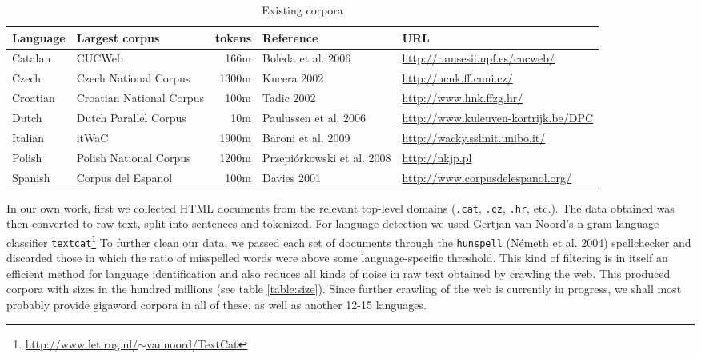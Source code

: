 \documentclass[10pt, a4paper]{article}
\begin{document}
\begin{table*}[ht]
\centering
\begin{tabular}{|l|l|r|l|l|}
\hline
Language & Largest corpus & tokens & Reference & URL\\
\hline
Catalan & CUCWeb & 166m & Boleda et al. 2006\nocite{boleda2006cucweb} & \href{http://ramsesii.upf.es/cucweb/}{http://ramsesii.upf.es/cucweb/}\\
Czech & Czech National Corpus& 1300m & Kucera 2002\nocite{kucera2002czech} & \href{http://ucnk.ff.cuni.cz/}{http://ucnk.ff.cuni.cz/}\\
Croatian & Croatian National Corpus& 100m & Tadic 2002\nocite{tadic2002building}& \href{http://www.hnk.ffzg.hr/}{http://www.hnk.ffzg.hr/} \\
Dutch & Dutch Parallel Corpus & 10m & Paulussen et al. 2006\nocite{paulussen2006dutch} & \href{http://www.kuleuven-kortrijk.be/DPC}{http://www.kuleuven-kortrijk.be/DPC} \\
Italian & itWaC & 1900m & Baroni et al. 2009& \href{http://wacky.sslmit.unibo.it/}{http://wacky.sslmit.unibo.it/} \\
Polish & Polish National Corpus & 1200m &Przepi{\'o}rkowski et al. 2008\nocite{przepiorkowski2008towards}& \href{http://nkjp.pl}{http://nkjp.pl} \\
Spanish & Corpus del Espanol & 100m & Davies 2001\nocite{davies2001creating}& \href{http://www.corpusdelespanol.org/}{http://www.corpusdelespanol.org/}\\
\hline
\end{tabular}
\caption{Existing corpora}
\label{table:existing}
\end{table*}

In our own work, first we collected HTML documents from the relevant top-level domains
(\texttt{.cat}, \texttt{.cz}, \texttt{.hr}, etc.). The data obtained was then
converted to raw text, split into sentences and tokenized. For language
detection we used Gertjan van Noord’s n-gram language classifier
\texttt{textcat}\footnote{\href{http://www.let.rug.nl/\~vannoord/TextCat}{http://www.let.rug.nl/$\sim$vannoord/TextCat}}
To further clean our data, we passed each set of documents through the
\texttt{hunspell} (Németh et al. 2004)\nocite{nemeth2004leveraging}
spellchecker and discarded those in which the ratio of misspelled words were
above some language-specific threshold. This kind of filtering is in itself an
efficient method for language identification and also reduces all kinds of
noise in raw text obtained by crawling the web. This produced corpora with
sizes in the hundred millions (see table \ref{table:size}). Since further
crawling of the web is currently in progress, we shall most probably provide
gigaword corpora in all of these, as well as another 12-15 languages.
\end{document}
